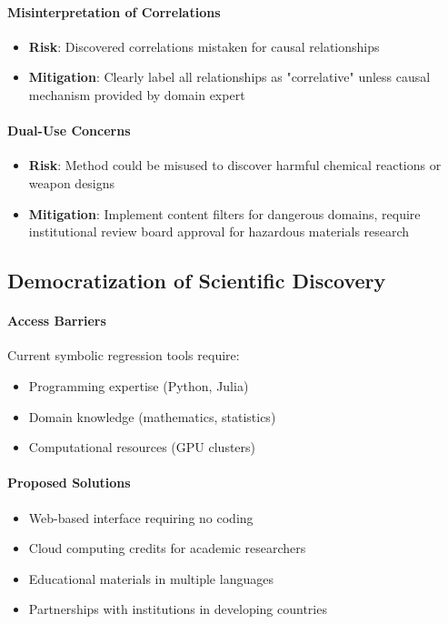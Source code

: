 \paragraph{Misinterpretation of Correlations}
\begin{itemize}
    \item \textbf{Risk}: Discovered correlations mistaken for causal relationships
    \item \textbf{Mitigation}: Clearly label all relationships as "correlative" unless causal mechanism provided by domain expert
\end{itemize}

\paragraph{Dual-Use Concerns}
\begin{itemize}
    \item \textbf{Risk}: Method could be misused to discover harmful chemical reactions or weapon designs
    \item \textbf{Mitigation}: Implement content filters for dangerous domains, require institutional review board approval for hazardous materials research
\end{itemize}

\subsection{Democratization of Scientific Discovery}

\paragraph{Access Barriers}
Current symbolic regression tools require:
\begin{itemize}
    \item Programming expertise (Python, Julia)
    \item Domain knowledge (mathematics, statistics)
    \item Computational resources (GPU clusters)
\end{itemize}

\paragraph{Proposed Solutions}
\begin{itemize}
    \item Web-based interface requiring no coding
    \item Cloud computing credits for academic researchers
    \item Educational materials in multiple languages
    \item Partnerships with institutions in developing countries
\end{itemize}

